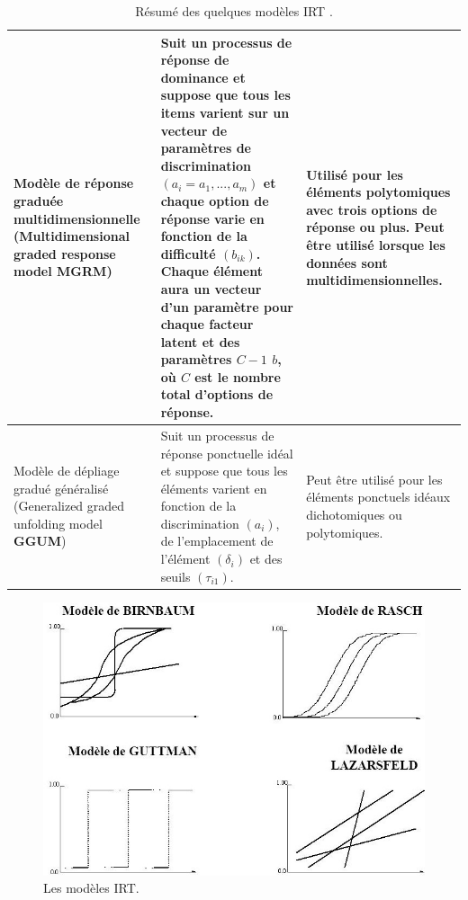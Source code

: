 \begin{table}[H]
\begin{tabular}{|m{4cm}|m{6cm}|m{6cm}|}
	Modèle de réponse graduée multidimensionnelle (Multidimensional graded response model \textbf{MGRM}) &Suit un processus de réponse de dominance et suppose que tous les items varient sur un vecteur de paramètres de discrimination \(\displaystyle (a_{i} = a_{1},...,a_{m} )\) et chaque option de réponse varie en fonction de la difficulté \(\displaystyle (b_{ik})\). Chaque élément aura un vecteur d'un paramètre pour chaque facteur latent et des paramètres \(\displaystyle C - 1 \) \(\displaystyle b \), où \(\displaystyle C \) est le nombre total d'options de réponse. & Utilisé pour les éléments polytomiques avec trois options de réponse ou plus. Peut être utilisé lorsque les données sont multidimensionnelles.\\ \hline
	Modèle de dépliage gradué généralisé (Generalized graded unfolding model \textbf{GGUM}) & Suit un processus de réponse ponctuelle idéal et suppose que tous les éléments varient en fonction de la discrimination \(\displaystyle (a_{i})\), de l'emplacement de l'élément \(\displaystyle (\delta_{i})\) et des seuils \(\displaystyle (\tau_{i1})\). & Peut être utilisé pour les éléments ponctuels idéaux dichotomiques ou polytomiques. \\ \hline
	\end{tabular}
	\caption{Résumé des quelques modèles IRT \cite{nye2020advancing}.}
	\label{irt_modeles}
\end{table}

\begin{figure}[H]
	\begin{center}
		\includegraphics[width=\textwidth]{images/chapitre5/irt_models.jpg}
	\end{center}
	\caption{Les modèles IRT.}
	\label{irt_models}
\end{figure}

